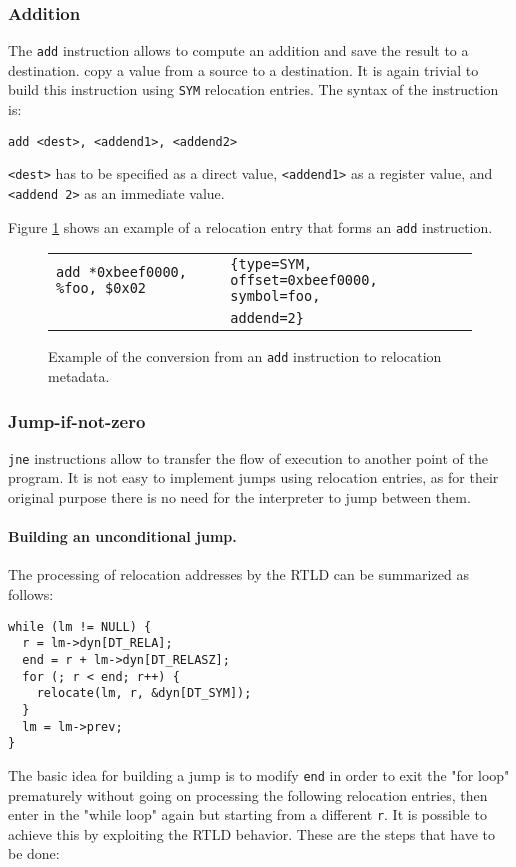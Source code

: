 \documentclass[11pt,twoside,a4paper]{article}
\begin{document}
\subsubsection{Addition}
The \texttt{add} instruction allows to compute an addition and save the result to a destination. copy a value from a source to a destination. It is again trivial to build this instruction using \texttt{SYM} relocation entries. The syntax of the instruction is:

\texttt{add <dest>, <addend1>, <addend2>}

\texttt{<dest>} has to be specified as a direct value, \texttt{<addend1>} as a register value, and \texttt{<addend 2>} as an immediate value.

Figure \ref{add_table} shows an example of a relocation entry that forms an \texttt{add} instruction.

\begin{figure}
\begin{tabular}{ l | l }
  \hline
  \texttt{add *0xbeef0000, \%foo, \$0x02} & \texttt{\{type=SYM, offset=0xbeef0000, symbol=foo,} \\ 
& \texttt{addend=2\}} \\
  \hline
\end{tabular}
\caption{Example of the conversion from an \texttt{add} instruction to relocation metadata.}
\label{add_table}
\end{figure}


\subsubsection{Jump-if-not-zero}
\texttt{jne} instructions allow to transfer the flow of execution to another point of the program. It is not easy to implement jumps using relocation entries, as for their original purpose there is no need for the interpreter to jump between them.

\paragraph{Building an unconditional jump.}
The processing of relocation addresses by the RTLD can be summarized as follows:
\begin{lstlisting}
while (lm != NULL) {
  r = lm->dyn[DT_RELA];
  end = r + lm->dyn[DT_RELASZ];
  for (; r < end; r++) {
    relocate(lm, r, &dyn[DT_SYM]);
  }
  lm = lm->prev;
}
\end{lstlisting}

The basic idea for building a jump is to modify \texttt{end} in order to exit the "for loop" prematurely without going on processing the following relocation entries, then enter in the "while loop" again but starting from a different \texttt{r}.
It is possible to achieve this by exploiting the RTLD behavior. These are the steps that have to be done:
\end{document}
